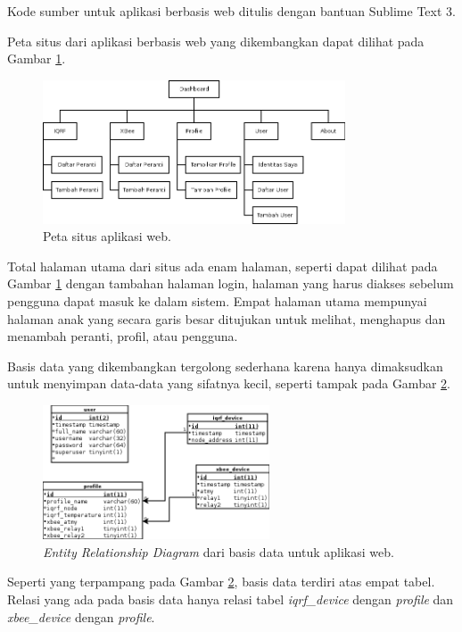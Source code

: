 			Kode sumber untuk aplikasi berbasis web ditulis dengan bantuan Sublime Text 3.
			
			Peta situs dari aplikasi berbasis web yang dikembangkan dapat dilihat pada Gambar \ref{sitemap}.
			
			\begin{figure}[H]
			  \centering
			    \includegraphics[width=0.8\textwidth]{gambar/sitemap}
			    \caption{Peta situs aplikasi web.}
			    \label{sitemap}
			\end{figure}

			Total halaman utama dari situs ada enam halaman, seperti dapat dilihat pada Gambar \ref{sitemap} dengan tambahan halaman login, halaman yang harus diakses sebelum pengguna dapat masuk ke dalam sistem. Empat halaman utama mempunyai halaman anak yang secara garis besar ditujukan untuk melihat, menghapus dan menambah peranti, profil, atau pengguna.

			Basis data yang dikembangkan tergolong sederhana karena hanya dimaksudkan untuk menyimpan data-data yang sifatnya kecil, seperti tampak pada Gambar \ref{erd}.

			\begin{figure}[H]
			  \centering
			    \includegraphics[width=0.6\textwidth]{gambar/erd}
			    \caption{\emph{Entity Relationship Diagram} dari basis data untuk aplikasi web.}
			    \label{erd}
			\end{figure}

			Seperti yang terpampang pada Gambar \ref{erd}, basis data terdiri atas empat tabel. Relasi yang ada pada basis data hanya relasi tabel \emph{iqrf\_device} dengan \emph{profile} dan \emph{xbee\_device} dengan \emph{profile}.

